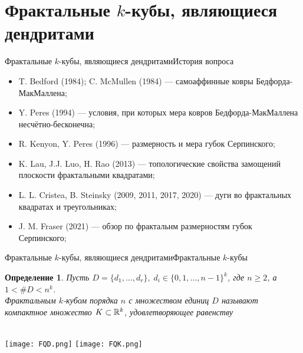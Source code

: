 \documentclass[aspectratio=1610, 10pt, notheorems]{beamer}
\newtheorem{definition}  {Определение}
\begin{document}
%



\section{Фрактальные $k$-кубы, являющиеся дендритами}


\begin{frame}{Фрактальные $k$-кубы, являющиеся дендритами}{История вопроса}
\begin{itemize}
    \item T. Bedford (1984); C. McMullen (1984) --- самоаффинные ковры Бедфорда-МакМаллена;
    \item Y. Peres (1994) --- условия, при которых мера ковров Бедфорда-МакМаллена несчётно-бесконечна;
    \item R. Kenyon, Y. Peres (1996) --- размерность и мера губок Серпинского;
    \item K. Lau, J.J. Luo, H. Rao (2013) --- топологические свойства замощений плоскости фрактальными квадратами;
    \item L. L. Cristea, B. Steinsky (2009, 2011, 2017, 2020) --- дуги во фрактальных квадратах и треугольниках;
    \item J. M. Fraser (2021) --- обзор по фрактальнм размерностям губок Серпинского;
\end{itemize}
\end{frame}


\begin{frame}{Фрактальные $k$-кубы, являющиеся дендритами}{Фрактальные $k$-кубы}

\begin{definition}
Пусть  $D=\{d_1,\ldots,d_r\},\; d_i\in\{0,1,\ldots,n-1\}^k$, где $n\ge 2$, а $1<\#D<n^k$.\\
{\em Фрактальным $k$-кубом порядка $n$ с множеством единиц $D$} называют компактное множество $K\subset\mathbb{R}^k$, удовлетворяющее равенству\\
\end{definition}
\;\\
\qquad\qquad
\texttt{[image: FQD.png]}
\hfill
\texttt{[image: FQK.png]}
\qquad\qquad
\end{frame}
\end{document}
